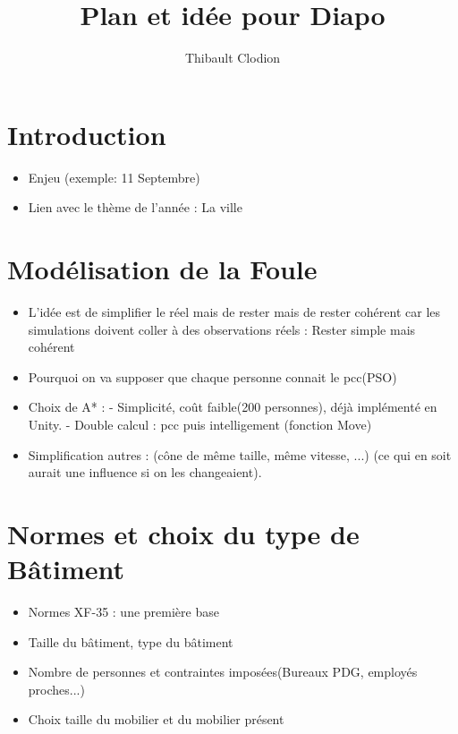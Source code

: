 \documentclass[12pt]{article}
\title{Plan et idée pour Diapo}
\author{Thibault Clodion}
\begin{document}
\maketitle %

\section{Introduction}

\begin{itemize}
    \item Enjeu (exemple: 11 Septembre)
    \item Lien avec le thème de l'année : La ville
\end{itemize}

\section{Modélisation de la Foule}

\begin{itemize}
    \item L'idée est de simplifier le réel mais de rester mais de rester cohérent car les simulations 
    doivent coller à des observations réels : Rester simple mais cohérent
    \item Pourquoi on va supposer que chaque personne connait le pcc(PSO)
    \item Choix de A* :
    \newline - Simplicité, coût faible(200 personnes), déjà implémenté en Unity.
    \newline - Double calcul : pcc puis intelligement (fonction Move)
    \item Simplification autres : (cône de même taille, même vitesse, ...) (ce qui en soit aurait une influence si on les changeaient).
\end{itemize}

\section{Normes et choix du type de Bâtiment}

\begin{itemize}
    \item Normes XF-35 : une première base
    \item Taille du bâtiment, type du bâtiment
    \item Nombre de personnes et contraintes imposées(Bureaux PDG, employés proches...)
    \item Choix taille du mobilier et du mobilier présent
\end{itemize}
\end{document}
